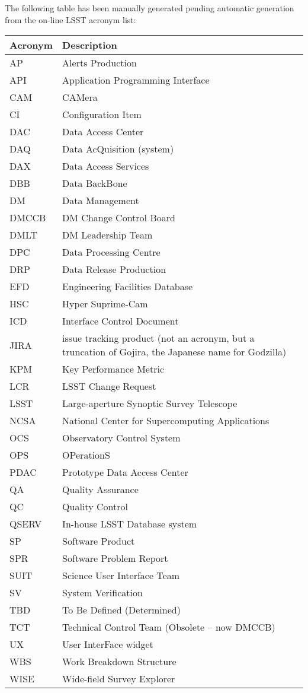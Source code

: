 The following table has been manually generated pending automatic generation from the on-line LSST acronym list:
\newline\newline%
\addtocounter{table}{-1}
\begin{longtable}{|l|p{}|}\hline
\textbf{Acronym} & \textbf{Description}  \\\hline
AP&Alerts Production \\\hline
API&Application Programming Interface \\\hline
CAM&CAMera \\\hline
CI&Configuration Item \\\hline
DAC&Data Access Center \\\hline
DAQ&Data AcQuisition (system) \\\hline
DAX&Data Access Services \\\hline
DBB&Data BackBone \\\hline
DM&Data Management \\\hline
DMCCB&DM Change Control Board \\\hline
DMLT&DM Leadership Team \\\hline
DPC&Data Processing Centre \\\hline
DRP&Data Release Production \\\hline
EFD&Engineering Facilities Database \\\hline
HSC&Hyper Suprime-Cam \\\hline
ICD&Interface Control Document \\\hline
JIRA&issue tracking product (not an acronym, but a truncation of Gojira, the Japanese name for Godzilla) \\\hline
KPM&Key Performance Metric \\\hline
LCR&LSST Change Request \\\hline
LSST&Large-aperture Synoptic Survey Telescope \\\hline
NCSA&National Center for Supercomputing Applications \\\hline
OCS&Observatory Control System \\\hline
OPS&OPerationS \\\hline
PDAC&Prototype Data Access Center \\\hline
QA&Quality Assurance \\\hline
QC&Quality Control \\\hline
QSERV&In-house LSST Database system \\\hline
SP&Software Product \\\hline
SPR&Software Problem Report \\\hline
SUIT&Science User Interface Team \\\hline
SV&System Verification \\\hline
TBD&To Be Defined (Determined) \\\hline
TCT&Technical Control Team (Obsolete -- now DMCCB) \\\hline
UX&User InterFace widget \\\hline
WBS&Work Breakdown Structure \\\hline
WISE&Wide-field Survey Explorer \\\hline
\end{longtable}
